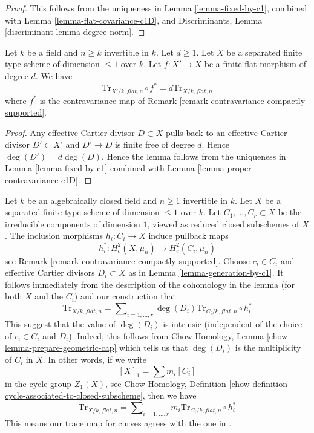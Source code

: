 \begin{proof}
This follows from the uniqueness in
Lemma \ref{lemma-fixed-by-c1}, combined with
Lemma \ref{lemma-flat-covariance-c1D}, and
Discriminants, Lemma \ref{discriminant-lemma-degree-norm}.
\end{proof}

\begin{lemma}
\label{lemma-proper-contravariance-trace-curve}
Let $k$ be a field and $n \geq k$ invertible in $k$. Let $d \geq 1$.
Let $X$ be a separated finite type scheme of dimension $\leq 1$ over $k$.
Let $f : X' \to X$ be a finite flat morphism of degree $d$.
We have
$$
\text{Tr}_{X'/k, \mathit{flat}, n} \circ f^* =
d \text{Tr}_{X/k, \mathit{flat}, n}
$$
where $f^*$ is the contravariance map of
Remark \ref{remark-contravariance-compactly-supported}.
\end{lemma}

\begin{proof}
Any effective Cartier divisor $D \subset X$
pulls back to an effective Cartier divisor $D' \subset X'$
and $D' \to D$ is finite free of degree $d$.
Hence $\deg(D') = d\deg(D)$. Hence the lemma follows from the uniqueness in
Lemma \ref{lemma-fixed-by-c1} combined with
Lemma \ref{lemma-proper-contravariance-c1D}.
\end{proof}

\begin{example}
\label{example-elucidate}
Let $k$ be an algebraically closed field and $n \geq 1$ invertible in $k$.
Let $X$ be a separated finite type scheme of dimension $\leq 1$ over $k$.
Let $C_1, \ldots, C_r \subset X$ be the irreducible components of
dimension $1$, viewed as reduced closed subschemes of $X$.
The inclusion morphisms $h_i : C_i \to X$ induce pullback maps
$$
h_i^* : H^2_c(X, \mu_n) \to H^2_c(C_i, \mu_n)
$$
see Remark \ref{remark-contravariance-compactly-supported}.
Choose $c_i \in C_i$ and effective Cartier divisors $D_i \subset X$ as in
Lemma \ref{lemma-generation-by-c1}. It follows immediately from the
description of the cohomology in the lemma (for both $X$ and the
$C_i$) and our construction that
$$
\text{Tr}_{X/k, \mathit{flat}, n} = 
\sum\nolimits_{i = 1, \ldots, r}
\deg(D_i) \text{Tr}_{C_i/k, \mathit{flat}, n} \circ h_i^*
$$
This suggest that the value of $\deg(D_i)$ is intrinsic (independent
of the choice of $c_i \in C_i$ and $D_i$). Indeed, this follows from
Chow Homology, Lemma \ref{chow-lemma-prepare-geometric-cap} which tells
us that $\deg(D_i)$ is the multiplicity of $C_i$ in $X$.
In other words, if we write
$$
[X]_1 = \sum m_i [C_i]
$$
in the cycle group $Z_1(X)$, see Chow Homology, Definition
\ref{chow-definition-cycle-associated-to-closed-subscheme}, then we have
$$
\text{Tr}_{X/k, \mathit{flat}, n} = 
\sum\nolimits_{i = 1, \ldots, r}
m_i \text{Tr}_{C_i/k, \mathit{flat}, n} \circ h_i^*
$$
This means our trace map for curves agrees with the one in
\cite[Exposee XVII, Equation (1.1.3.3)]{SGA4}.
\end{example}






